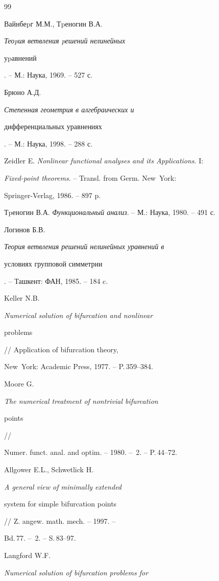 \begin{thebibliography}{99}







Вайнбеpг М.М., Тpеногин В.А. {\em Теоpия ветвления pешений нелинейных


уpавнений}. -- М.: Наука,  1969. -- 527 с.




Брюно А.Д. {\em Степенная геометрия в алгебраических и


дифференциальных уравнениях}. -- М.: Наука, 1998. -- 288 с.




Zeidler E. {\em Nonlinear functional analyses and its Applications}. I:


{\em Fixed-point theorems}. -- Transl. from Germ. New~York:


Springer-Verlag, 1986. -- 897 p.




Тpеногин В.А. {\em Функциональный анализ}. -- М.: Наука, 1980. -- 491 с.




Логинов Б.В. {\em Теория ветвления решений нелинейных уравнений в


условиях групповой симметрии}. -- Ташкент: ФАН, 1985. -- 184 c.




Keller N.B. {\em Numerical solution of bifurcation and nonlinear


problems} // Application of bifurcation theory, %


New~York: Academic Press, 1977. -- P.\,359--384.




Moore G. {\em The numerical treatment of nontrivial bifurcation


points} //


Numer. funct. anal. and optim. -- 1980. -- \No\,2. -- P.\,44--72.




Allgower E.L., Schwetlick H. {\em A general view of minimally extended


system for simple bifurcation points} // Z. angew. math. mech. -- 1997. --


Bd.\,77. -- \No\,2. -- S.\,83--97.




Langford W.F. {\em Numerical solution of bifurcation problems for


}
\end{thebibliography}

